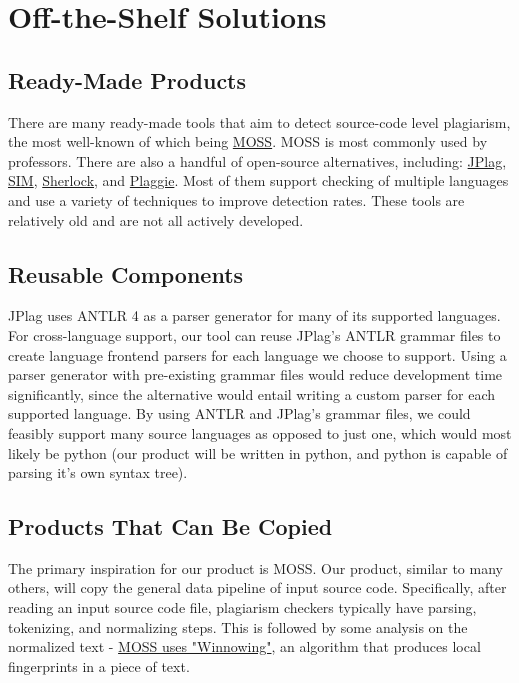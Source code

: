 \documentclass[12pt]{article}
\begin{document}
\section{Off-the-Shelf Solutions}
\subsection{Ready-Made Products}

There are many ready-made tools that aim to detect source-code level plagiarism, the most well-known of which being \href{https://theory.stanford.edu/~aiken/moss/}{MOSS}. MOSS is most commonly used by professors.
There are also a handful of open-source alternatives, including: \href{https://github.com/jplag/JPlag}{JPlag}, \href{https://dickgrune.com/Programs/similarity_tester/}{SIM}, \href{https://warwick.ac.uk/fac/sci/dcs/research/ias/software/sherlock/}{Sherlock}, and \href{https://www.cs.hut.fi/Software/Plaggie/}{Plaggie}.
Most of them support checking of multiple languages and use a variety of techniques to improve detection rates. These tools are relatively old and are not all actively developed.

\subsection{Reusable Components}

JPlag uses ANTLR 4 as a parser generator for many of its supported languages. For cross-language support, our tool can reuse JPlag's ANTLR grammar files to create language frontend parsers for each language we choose to support. Using a parser generator with pre-existing grammar files would reduce development time significantly, since the alternative would entail writing a custom parser for each supported language. By using ANTLR and JPlag's grammar files, we could feasibly support many source languages as opposed to just one, which would most likely be python (our product will be written in python, and python is capable of parsing it's own syntax tree).

\subsection{Products That Can Be Copied}

The primary inspiration for our product is MOSS. Our product, similar to many others, will copy the general data pipeline of input source code. Specifically, after reading an input source code file, plagiarism checkers typically have parsing, tokenizing, and normalizing steps. This is followed by some analysis on the normalized text - \href{https://theory.stanford.edu/~aiken/publications/papers/sigmod03.pdf}{MOSS uses "Winnowing"}, an algorithm that produces local fingerprints in a piece of text.
\end{document}
